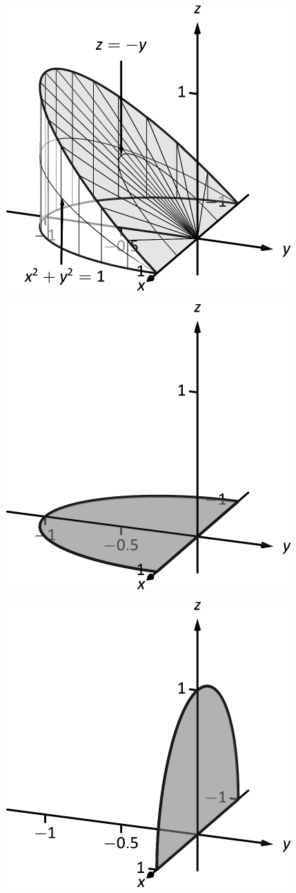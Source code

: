 \documentclass[10pt]{article}
\begin{document}
\includegraphics{figtrip3_3DBW.pdf}
\texttt{}

\includegraphics{figtrip3b_3DBW.pdf}
\texttt{}

\includegraphics{figtrip3c_3DBW.pdf}
\texttt{}
\end{document}
